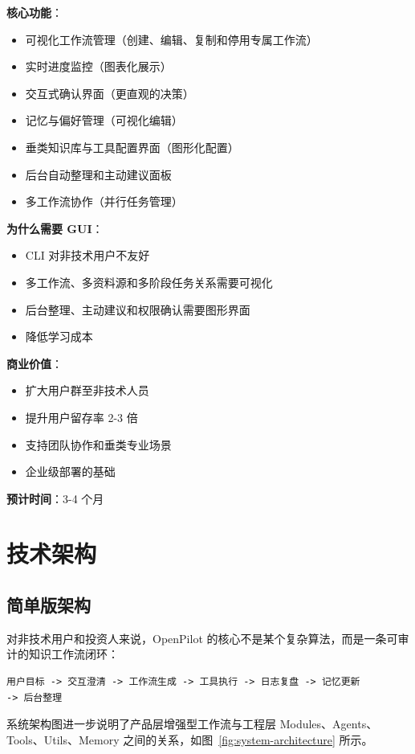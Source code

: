 \documentclass[12pt,a4paper]{ctexart}
\begin{document}
\textbf{核心功能}：
\begin{itemize}
  \item 可视化工作流管理（创建、编辑、复制和停用专属工作流）
  \item 实时进度监控（图表化展示）
  \item 交互式确认界面（更直观的决策）
  \item 记忆与偏好管理（可视化编辑）
  \item 垂类知识库与工具配置界面（图形化配置）
  \item 后台自动整理和主动建议面板
  \item 多工作流协作（并行任务管理）
\end{itemize}

\textbf{为什么需要 GUI}：
\begin{itemize}
  \item CLI 对非技术用户不友好
  \item 多工作流、多资料源和多阶段任务关系需要可视化
  \item 后台整理、主动建议和权限确认需要图形界面
  \item 降低学习成本
\end{itemize}

\textbf{商业价值}：
\begin{itemize}
  \item 扩大用户群至非技术人员
  \item 提升用户留存率 2-3 倍
  \item 支持团队协作和垂类专业场景
  \item 企业级部署的基础
\end{itemize}

\textbf{预计时间}：3-4 个月

\section{技术架构}

\subsection{简单版架构}

对非技术用户和投资人来说，OpenPilot 的核心不是某个复杂算法，而是一条可审计的知识工作流闭环：

\begin{verbatim}
用户目标 -> 交互澄清 -> 工作流生成 -> 工具执行 -> 日志复盘 -> 记忆更新 
-> 后台整理
\end{verbatim}

系统架构图进一步说明了产品层增强型工作流与工程层 Modules、Agents、Tools、Utils、Memory 之间的关系，如图~\ref{fig:system-architecture} 所示。
\end{document}
